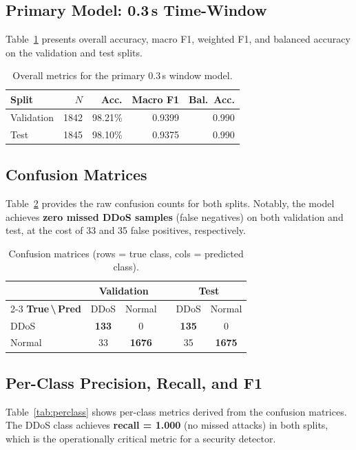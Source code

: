 \documentclass[conference]{IEEEtran}
\begin{document}
\subsection{Primary Model: 0.3\,s Time-Window}
Table~\ref{tab:mainresults} presents overall accuracy, macro F1, weighted F1,
and balanced accuracy on the validation and test splits.

\begin{table}[htbp]
\centering
\caption{Overall metrics for the primary 0.3\,s window model.}
\label{tab:mainresults}
\renewcommand{\arraystretch}{1.1}
\begin{tabular}{@{}lrrrr@{}}
\toprule
\textbf{Split} & \textbf{$N$} & \textbf{Acc.} & \textbf{Macro F1} & \textbf{Bal.\ Acc.} \\
\midrule
Validation & 1842 & 98.21\% & 0.9399 & 0.990 \\
Test       & 1845 & 98.10\% & 0.9375 & 0.990 \\
\bottomrule
\end{tabular}
\end{table}

\subsection{Confusion Matrices}
Table~\ref{tab:confusion} provides the raw confusion counts for both splits.
Notably, the model achieves \textbf{zero missed DDoS samples} (false negatives)
on both validation and test, at the cost of 33 and 35 false positives,
respectively.

\begin{table}[htbp]
\centering
\caption{Confusion matrices (rows = true class, cols = predicted class).}
\label{tab:confusion}
\renewcommand{\arraystretch}{1.1}
\begin{tabular}{@{}lccrcc@{}}
\toprule
 & \multicolumn{2}{c}{\textbf{Validation}} && \multicolumn{2}{c}{\textbf{Test}} \\
\cmidrule{2-3}\cmidrule{5-6}
\textbf{True\,\textbackslash\,Pred} & DDoS & Normal && DDoS & Normal \\
\midrule
DDoS   & \textbf{133} & 0  && \textbf{135} & 0  \\
Normal & 33  & \textbf{1676} && 35  & \textbf{1675} \\
\bottomrule
\end{tabular}
\end{table}

\subsection{Per-Class Precision, Recall, and F1}
Table~\ref{tab:perclass} shows per-class metrics derived from the confusion
matrices.
The DDoS class achieves \textbf{recall = 1.000} (no missed attacks) in both
splits, which is the operationally critical metric for a security detector.
\end{document}
